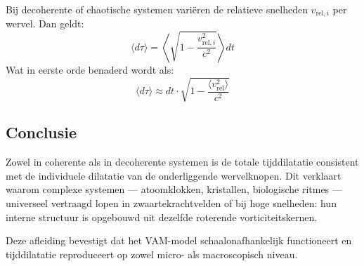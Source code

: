 Bij decoherente of chaotische systemen variëren de relatieve snelheden \( v_{\text{rel}, i} \) per wervel. Dan geldt:
\begin{equation}
    \langle d\tau \rangle = \left\langle \sqrt{1 - \frac{v_{\text{rel}, i}^2}{c^2}} \right\rangle dt
\end{equation}
Wat in eerste orde benaderd wordt als:
\begin{equation}
    \langle d\tau \rangle \approx dt \cdot \sqrt{1 - \frac{\langle v_\text{rel}^2 \rangle}{c^2}} \label{eq:average_dil}
\end{equation}

\subsection*{Conclusie}

Zowel in coherente als in decoherente systemen is de totale tijddilatatie consistent met de individuele dilatatie van de onderliggende wervelknopen. Dit verklaart waarom complexe systemen — atoomklokken, kristallen, biologische ritmes — universeel vertraagd lopen in zwaartekrachtvelden of bij hoge snelheden: hun interne structuur is opgebouwd uit dezelfde roterende vorticiteitskernen.

\vspace{1em}
\noindent
Deze afleiding bevestigt dat het VAM-model schaalonafhankelijk functioneert en tijddilatatie reproduceert op zowel micro- als macroscopisch niveau.